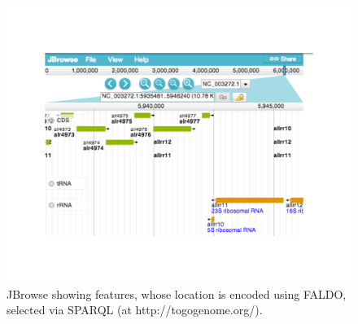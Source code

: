 \begin{figure}
\begin{center}
\includegraphics[width=17cm]{figures/togogenomes.pdf}
\end{center}
\caption{JBrowse showing features, whose location is encoded using FALDO, selected via SPARQL (at http://togogenome.org/). }
\label{fig:jbrowse}
\end{figure}


